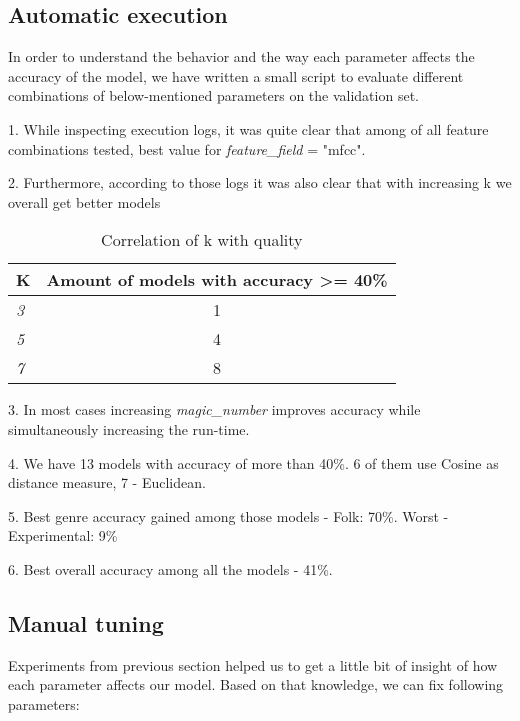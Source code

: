 \documentclass[11pt]{article}
\begin{document}
\subsection*{Automatic execution}

In order to understand the behavior and the way each parameter affects the accuracy of the model, we have written a small script to evaluate different combinations of below-mentioned parameters on the validation set.

1. While inspecting execution logs, it was quite clear that among of all feature combinations tested, best value for \textit{feature\_field} = "mfcc".

2. Furthermore, according to those logs it was also clear that with increasing k we overall get better models

\begin{table*}[htb]
\begin{center}
\begin{tabular}{|l|c|}
\hline
\textbf{K}          & \textbf{Amount of models with accuracy >= 40\%}                             
\\ \hline
\textit{3}          & 1                         
\\ \hline
\textit{5}          & 4                                                              
\\ \hline
\textit{7}          & 8            
\\ \hline
\end{tabular}%
\caption{Correlation of k with quality}
\end{center}
\end{table*}

3. In most cases increasing \textit{magic\_number} improves accuracy while simultaneously increasing the run-time.  

4. We have 13 models with accuracy of more than 40\%. 6 of them use Cosine as distance measure, 7 - Euclidean.

5. Best genre accuracy gained among those models - Folk: 70\%. Worst - Experimental: 9\%

6. Best overall accuracy among all the models - 41\%. 

\subsection*{Manual tuning}

Experiments from previous section helped us to get a little bit of insight of how each parameter affects our model.
Based on that knowledge, we can fix following parameters:
\end{document}
